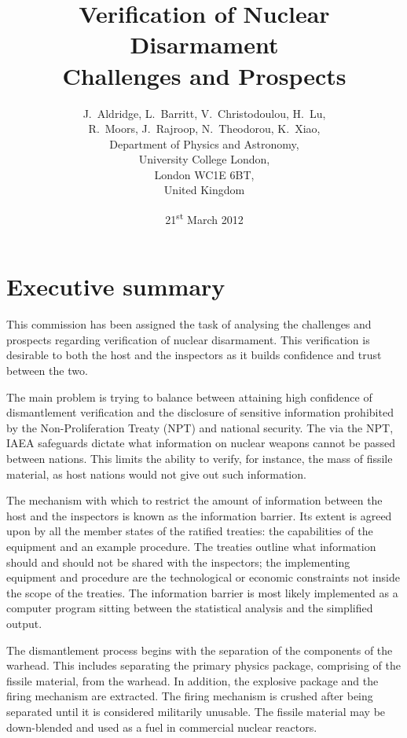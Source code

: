 \documentclass[twoside,titlepage,11pt,twocolumn,a4paper]{article}
\begin{document}
\title{Verification of Nuclear Disarmament \\
Challenges and Prospects}
\author{J.~Aldridge, L.~Barritt, V.~Christodoulou, H.~Lu, \\
	R.~Moors, J.~Rajroop, N.~Theodorou, K.~Xiao, \\
\small	Department of Physics and Astronomy, \\
\small	University College London, \\
\small	London WC1E 6BT, \\
\small	United Kingdom}
\date{21\textsuperscript{st} March 2012}
\maketitle

\onecolumn
\cleardoublepage

\section*{Executive summary}

This commission has been assigned the task of analysing the challenges
and prospects regarding verification of nuclear disarmament. This
verification is desirable to both the host and the inspectors as it
builds confidence and trust between the two.

The main problem is trying to balance between attaining high confidence of dismantlement verification and the disclosure of sensitive information prohibited by the Non-Proliferation Treaty (NPT) and national security. The via the NPT, IAEA safeguards dictate what information on nuclear weapons cannot be passed between
nations. This limits the ability to verify, for instance, the mass of
fissile material, as host nations would not give out such information.

The mechanism with which to restrict the amount of information between
the host and the inspectors is known as the information barrier. Its
extent is agreed upon by all the member states of the ratified
treaties: the capabilities of the equipment and an example
procedure. The treaties outline what information should and should not
be shared with the inspectors; the implementing equipment and
procedure are the technological or economic constraints not inside the
scope of the treaties. The information barrier is most likely
implemented as a computer program sitting between the statistical
analysis and the simplified output.

The dismantlement process begins with the separation of the components of the
warhead. This includes separating the primary physics package,
comprising of the fissile material, from the warhead. In addition, the
explosive package and the firing mechanism are extracted. The firing
mechanism is crushed after being separated until it is considered
militarily unusable. The fissile material may be down-blended and used
as a fuel in commercial nuclear reactors.
\end{document}
